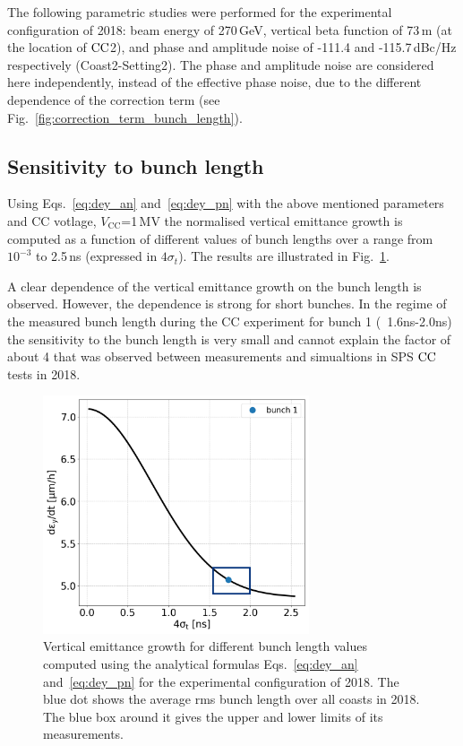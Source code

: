 The following parametric studies were performed for the experimental configuration of 2018: beam energy of 270\,GeV, vertical beta function of 73\,m (at the location of ${\mathrm{CC}}$2), and phase and amplitude noise of -111.4 and -115.7\,dBc/Hz respectively (Coast2-Setting2). The phase and amplitude noise are considered here independently, instead of the effective phase noise, due to the different dependence of the correction term (see Fig.~\ref{fig:correction_term_bunch_length}).

\subsection{Sensitivity to bunch length}\label{subsec:bunch_length_dependence}
Using Eqs.~\eqref{eq:dey_an} and~\eqref{eq:dey_pn} with the above mentioned parameters and CC votlage, $V_\mathrm{CC}$=1\,MV the normalised vertical emittance growth is computed as a function of different values of bunch lengths over a range from $10^{-3}$ to 2.5\,ns (expressed in $4\sigma_t$). The results are illustrated in Fig.~\ref{fig:sensitivity_bunch_length_theory_bunch1}. 

A clear dependence of the vertical emittance growth on the bunch length is observed. However, the dependence is strong for short bunches. In the regime of the measured bunch length during the CC experiment for bunch 1 (~1.6ns-2.0ns) the sensitivity to the bunch length is very small and cannot explain the factor of about 4 that was observed between measurements and simualtions in SPS ${\mathrm{CC}}$ tests in 2018.

\begin{figure}[!h]
    \centering         
    \includegraphics[width=0.7\textwidth]{images/Ch6/dey_vs_4sigmat_Coast2-Setting2_withBunches_v2.png}
        \caption{Vertical emittance growth for different bunch length values computed using the analytical formulas Eqs.~\eqref{eq:dey_an} and~\eqref{eq:dey_pn} for the experimental configuration of 2018. The blue dot shows the average rms bunch length over all coasts in 2018. The blue box around it gives the upper and lower limits of its measurements.}
        \label{fig:sensitivity_bunch_length_theory_bunch1}
 \end{figure}


